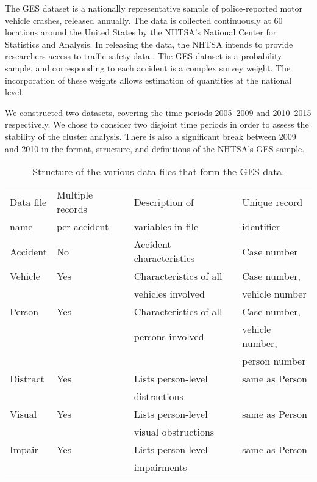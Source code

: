 The GES dataset is a nationally representative sample of
police-reported motor vehicle crashes, released annually. The data is
collected continuously at 60 locations around the United States by the
NHTSA's National Center for Statistics and Analysis. In releasing the
data, the NHTSA intends to provide researchers access to traffic
safety data \citep{NASS}. The GES dataset is a probability sample, and
corresponding to each accident is a complex survey weight. The
incorporation of these weights allows estimation of quantities at the
national level.

We constructed two datasets, covering the time periods 
2005--2009 and 2010--2015 respectively. We chose to consider two disjoint time
periods in order to assess the stability of the cluster
analysis. There is also a significant break between 2009 and 2010 in
the format, structure, and definitions of the NHTSA's GES sample.

\begin{table}[t]
\centering
\caption{Structure of the various data files that form the GES data.}
\label{table_ex1}
\begin{tabular}{@{}llll@{}}
\toprule
Data file   & Multiple records  & Description of            & Unique record  \\ 
name        & per accident      & variables in file         & identifier\\ \midrule
Accident    & No                & Accident characteristics  & Case number  \\
Vehicle     & Yes               & Characteristics of all    & Case number, \\
            &                   & vehicles involved         & vehicle number \\
Person      & Yes               & Characteristics of all    & Case number, \\
            &                   & persons involved          & vehicle number, \\
            &                   &                           & person number\\
Distract    & Yes               & Lists person-level        & same as Person \\
            &                   & distractions              & \\
Visual      & Yes               & Lists person-level        & same as Person  \\
            &                   & visual obstructions       & \\
Impair      & Yes               & Lists person-level        & same as Person  \\
            &                   & impairments               &  \\ \bottomrule
\end{tabular}
\end{table}

